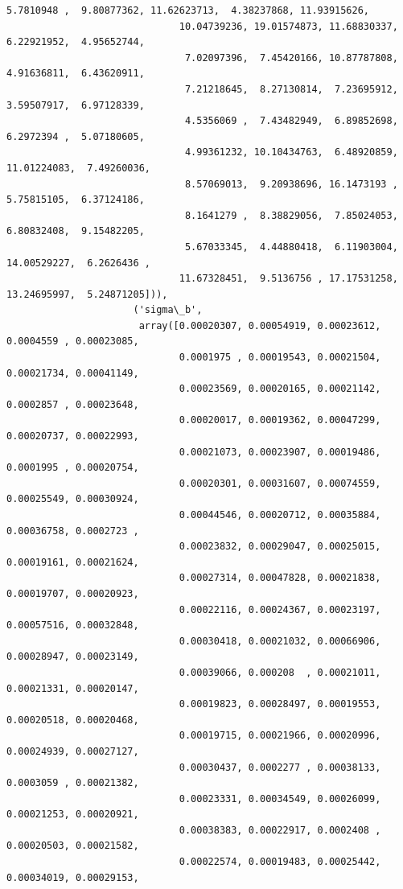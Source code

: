 \documentclass[11pt]{article}
\begin{document}
\begin{Verbatim}[commandchars=\\\{\}]
                               5.7810948 ,  9.80877362, 11.62623713,  4.38237868, 11.93915626,
                              10.04739236, 19.01574873, 11.68830337,  6.22921952,  4.95652744,
                               7.02097396,  7.45420166, 10.87787808,  4.91636811,  6.43620911,
                               7.21218645,  8.27130814,  7.23695912,  3.59507917,  6.97128339,
                               4.5356069 ,  7.43482949,  6.89852698,  6.2972394 ,  5.07180605,
                               4.99361232, 10.10434763,  6.48920859, 11.01224083,  7.49260036,
                               8.57069013,  9.20938696, 16.1473193 ,  5.75815105,  6.37124186,
                               8.1641279 ,  8.38829056,  7.85024053,  6.80832408,  9.15482205,
                               5.67033345,  4.44880418,  6.11903004, 14.00529227,  6.2626436 ,
                              11.67328451,  9.5136756 , 17.17531258, 13.24695997,  5.24871205])),
                      ('sigma\_b',
                       array([0.00020307, 0.00054919, 0.00023612, 0.0004559 , 0.00023085,
                              0.0001975 , 0.00019543, 0.00021504, 0.00021734, 0.00041149,
                              0.00023569, 0.00020165, 0.00021142, 0.0002857 , 0.00023648,
                              0.00020017, 0.00019362, 0.00047299, 0.00020737, 0.00022993,
                              0.00021073, 0.00023907, 0.00019486, 0.0001995 , 0.00020754,
                              0.00020301, 0.00031607, 0.00074559, 0.00025549, 0.00030924,
                              0.00044546, 0.00020712, 0.00035884, 0.00036758, 0.0002723 ,
                              0.00023832, 0.00029047, 0.00025015, 0.00019161, 0.00021624,
                              0.00027314, 0.00047828, 0.00021838, 0.00019707, 0.00020923,
                              0.00022116, 0.00024367, 0.00023197, 0.00057516, 0.00032848,
                              0.00030418, 0.00021032, 0.00066906, 0.00028947, 0.00023149,
                              0.00039066, 0.000208  , 0.00021011, 0.00021331, 0.00020147,
                              0.00019823, 0.00028497, 0.00019553, 0.00020518, 0.00020468,
                              0.00019715, 0.00021966, 0.00020996, 0.00024939, 0.00027127,
                              0.00030437, 0.0002277 , 0.00038133, 0.0003059 , 0.00021382,
                              0.00023331, 0.00034549, 0.00026099, 0.00021253, 0.00020921,
                              0.00038383, 0.00022917, 0.0002408 , 0.00020503, 0.00021582,
                              0.00022574, 0.00019483, 0.00025442, 0.00034019, 0.00029153,

\end{Verbatim}
\end{document}
